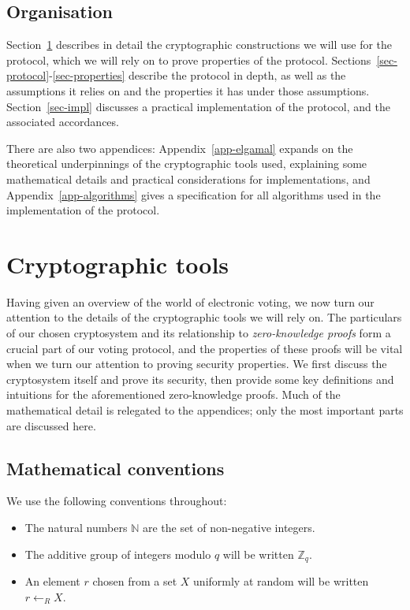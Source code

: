 \documentclass[12pt,a4paper]{article}
\theoremstyle{definition}
\begin{document}
\subsection{Organisation}
Section~\ref{sec-crypto} describes in detail the cryptographic constructions we will use for the protocol, which we will rely on to prove properties of the protocol. Sections~\ref{sec-protocol}-\ref{sec-properties} describe the protocol in depth, as well as the assumptions it relies on and the properties it has under those assumptions. Section~\ref{sec-impl} discusses a practical implementation of the protocol, and the associated accordances.

There are also two appendices: Appendix~\ref{app-elgamal} expands on the theoretical underpinnings of the cryptographic tools used, explaining some mathematical details and practical considerations for implementations, and Appendix~\ref{app-algorithms} gives a specification for all algorithms used in the implementation of the protocol.

\section{Cryptographic tools}\label{sec-crypto}
Having given an overview of the world of electronic voting, we now turn our attention to the details of the cryptographic tools we will rely on. The particulars of our chosen cryptosystem and its relationship to \textit{zero-knowledge proofs} form a crucial part of our voting protocol, and the properties of these proofs will be vital when we turn our attention to proving security properties. We first discuss the cryptosystem itself and prove its security, then provide some key definitions and intuitions for the aforementioned zero-knowledge proofs. Much of the mathematical detail is relegated to the appendices; only the most important parts are discussed here.

\subsection{Mathematical conventions}
We use the following conventions throughout:
\begin{itemize}
    \item The natural numbers $\mathbb{N}$ are the set of non-negative integers.
    \item The additive group of integers modulo $q$ will be written $\mathbb{Z}_q$.
    \item An element $r$ chosen from a set $X$ uniformly at random will be written $r\gets_R X$.
\end{itemize} 
\end{document}
